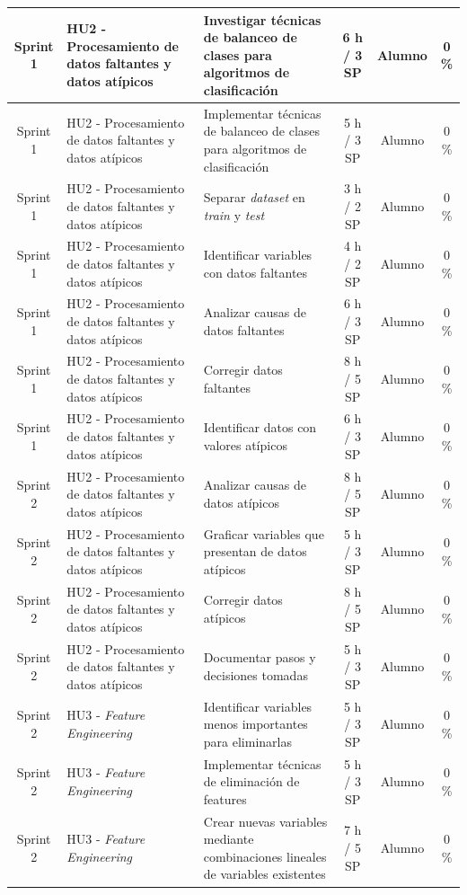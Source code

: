 \documentclass[
11pt, %
]{charter}
\begin{document}
\begin{xltabular}{\linewidth}{@{}|c|X|X|c|c|c|@{}}
Sprint 1 & HU2 - Procesamiento de datos faltantes y datos atípicos & Investigar técnicas de balanceo de clases para algoritmos de clasificación  & 6 h / 3 SP & Alumno & 0 \% \\ \hline
Sprint 1 & HU2 - Procesamiento de datos faltantes y datos atípicos & Implementar técnicas de balanceo de clases para algoritmos de clasificación  & 5 h / 3 SP & Alumno & 0 \% \\ \hline
Sprint 1 & HU2 - Procesamiento de datos faltantes y datos atípicos & Separar \textit{dataset} en \textit{train} y \textit{test}  & 3 h / 2 SP & Alumno & 0 \% \\ \hline
Sprint 1 & HU2 - Procesamiento de datos faltantes y datos atípicos & Identificar variables con datos faltantes  & 4 h / 2 SP & Alumno & 0 \%\\ \hline
Sprint 1 & HU2 - Procesamiento de datos faltantes y datos atípicos & Analizar causas de datos faltantes  & 6 h / 3 SP & Alumno & 0 \%\\ \hline
Sprint 1 & HU2 - Procesamiento de datos faltantes y datos atípicos & Corregir datos faltantes  & 8 h / 5 SP & Alumno & 0 \%\\ \hline
Sprint 1 & HU2 - Procesamiento de datos faltantes y datos atípicos & Identificar datos con valores atípicos  & 6 h / 3 SP & Alumno & 0 \%\\ \hline
Sprint 2 & HU2 - Procesamiento de datos faltantes y datos atípicos & Analizar causas de datos atípicos  & 8 h / 5 SP & Alumno & 0 \%\\ \hline
Sprint 2 & HU2 - Procesamiento de datos faltantes y datos atípicos & Graficar variables que presentan de datos atípicos  & 5 h / 3 SP & Alumno & 0 \% \\ \hline
Sprint 2 & HU2 - Procesamiento de datos faltantes y datos atípicos & Corregir datos atípicos  & 8 h / 5 SP & Alumno & 0 \%\\ \hline
Sprint 2 & HU2 - Procesamiento de datos faltantes y datos atípicos & Documentar pasos y decisiones tomadas  & 5 h / 3 SP & Alumno & 0 \% \\ \hline
Sprint 2 & HU3 - \textit{Feature Engineering}  & Identificar variables menos importantes para eliminarlas  & 5 h / 3 SP & Alumno & 0 \%\\ \hline
Sprint 2 & HU3 - \textit{Feature Engineering}  & Implementar técnicas de eliminación de features  & 5 h / 3 SP & Alumno & 0 \% \\ \hline
Sprint 2 & HU3 - \textit{Feature Engineering}  & Crear nuevas variables mediante combinaciones lineales de variables existentes  & 7 h / 5 SP & Alumno & 0 \%\\ \hline

\end{xltabular}
\end{document}
